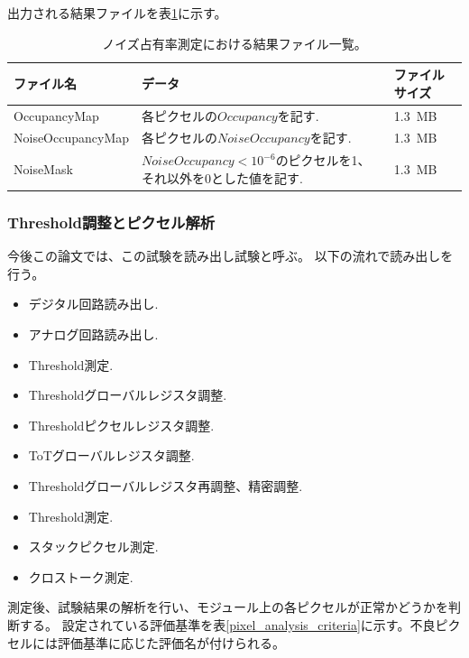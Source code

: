 出力される結果ファイルを表\ref{noise_result_files}に示す。

\begin{table}[tbp]
\begin{center}
\caption[ノイズ占有率測定における結果ファイル一覧]{ノイズ占有率測定における結果ファイル一覧。}
\label{noise_result_files}
  \small
  \begin{tabular}{|lll|} \hline
    ファイル名 & データ & ファイルサイズ \\ \hline
    OccupancyMap      & 各ピクセルの$Occupancy$を記す. & 1.3~MB \\ 
    NoiseOccupancyMap & 各ピクセルの$NoiseOccupancy$を記す. & 1.3~MB \\ 
    NoiseMask         & $NoiseOccupancy < 10^{-6}$のピクセルを1、それ以外を0とした値を記す. & 1.3~MB \\ \hline 
  \end{tabular}
\end{center}
\end{table}

\clearpage
\subsubsection{Threshold調整とピクセル解析}\label{sec:pixel_analysis}
今後この論文では、この試験を読み出し試験と呼ぶ。
以下の流れで読み出しを行う。
\begin{itemize}
  \item デジタル回路読み出し.
  \item アナログ回路読み出し.
  \item Threshold測定.
  \item Thresholdグローバルレジスタ調整.
  \item Thresholdピクセルレジスタ調整.
  \item ToTグローバルレジスタ調整.
  \item Thresholdグローバルレジスタ再調整、精密調整.
  \item Threshold測定.
  \item スタックピクセル測定.
  \item クロストーク測定.
\end{itemize}

測定後、試験結果の解析を行い、モジュール上の各ピクセルが正常かどうかを判断する。
設定されている評価基準を表\ref{pixel_analysis_criteria}に示す。不良ピクセルには評価基準に応じた評価名が付けられる。

